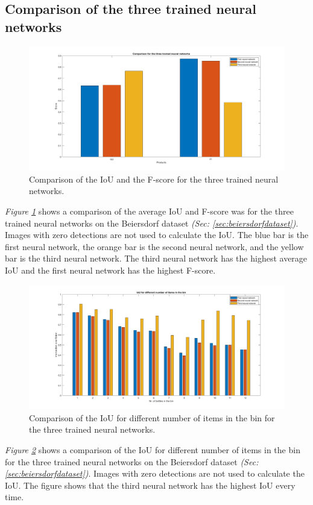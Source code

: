 \subsection{Comparison of the three trained neural networks}
\begin{figure}[h]
 \centering
 \includegraphics[width=\textwidth]{graphics/results/comparison1.png}
 \caption{Comparison of the IoU and the F-score for the three trained neural networks.}
 \label{fig:comparison1}
\end{figure}

\textit{Figure \ref{fig:comparison1}} shows a comparison of the average IoU and F-score was for the three trained neural networks on the Beiersdorf dataset \textit{(Sec: \ref{sec:beiersdorfdataset})}. Images with zero detections are not used to calculate the IoU. The blue bar is the first neural network, the orange bar is the second neural network, and the yellow bar is the third neural network. The third neural network has the highest average IoU and the first neural network has the highest F-score.

\begin{figure}[h]
 \centering
 \includegraphics[width=\textwidth]{graphics/results/comparison2.png}
 \caption{Comparison of the IoU for different number of items in the bin for the three trained neural networks.}
 \label{fig:comparison2}
\end{figure}

\textit{Figure \ref{fig:comparison2}} shows a comparison of the IoU for different number of items in the bin for the three trained neural networks on the Beiersdorf dataset \textit{(Sec: \ref{sec:beiersdorfdataset})}. Images with zero detections are not used to calculate the IoU. The figure shows that the third neural network has the highest IoU every time.

